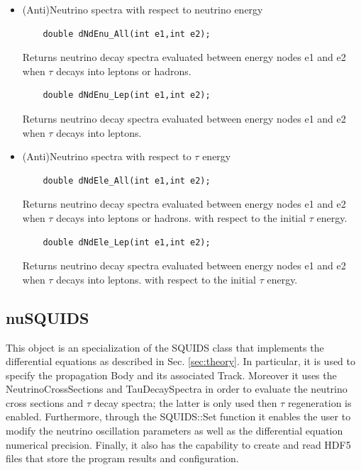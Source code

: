 \documentclass[3p,12pt,authoryear]{elsarticle}
\newcommand{\ttf}{\ttfamily}
\begin{document}
\begin{itemize}
\item (Anti)Neutrino spectra with respect to neutrino energy
  \begin{lstlisting}
    double dNdEnu_All(int e1,int e2);
  \end{lstlisting}
  Returns neutrino decay spectra evaluated between energy nodes  {\ttfamily e1} and {\ttfamily e2} when $\tau$ decays into leptons or hadrons.
  \begin{lstlisting}
    double dNdEnu_Lep(int e1,int e2);
  \end{lstlisting}
  Returns neutrino decay spectra evaluated between energy nodes  {\ttfamily e1} and {\ttfamily e2} when $\tau$ decays into leptons.
\item (Anti)Neutrino spectra with respect to $\tau$ energy
  \begin{lstlisting}
    double dNdEle_All(int e1,int e2);
  \end{lstlisting}
    Returns neutrino decay spectra evaluated between energy nodes  {\ttfamily e1} and {\ttfamily e2} when $\tau$ decays into leptons or hadrons. with
    respect to the initial $\tau$ energy.
  \begin{lstlisting}
    double dNdEle_Lep(int e1,int e2);
  \end{lstlisting}
     Returns neutrino decay spectra evaluated between energy nodes  {\ttfamily e1} and {\ttfamily e2} when $\tau$ decays into leptons. with
    respect to the initial $\tau$ energy.
\end{itemize}

\subsection{nuSQUIDS}

This object is an specialization of the {\ttf SQUIDS} class \citep{SQUIDS} that implements the
differential equations as described in Sec. \ref{sec:theory}. In particular, it is used to specify the propagation {\ttf Body} and its associated {\ttf Track}. Moreover it uses the {\ttf NeutrinoCrossSections} and {\ttf TauDecaySpectra} in order to evaluate the neutrino cross sections and $\tau$ decay spectra; the latter is only used then {\it $\tau$} regeneration is enabled. Furthermore, through the {\ttf SQUIDS::Set} function it enables the user to modify the neutrino oscillation parameters as well as the differential equation numerical precision. Finally, it also has the capability to create and read HDF5 files that store the program results and configuration.
\end{document}
